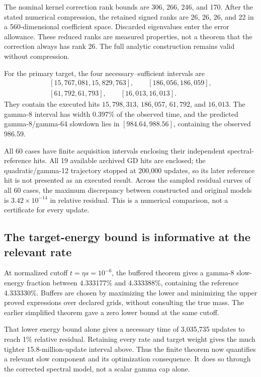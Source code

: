 \documentclass[11pt]{article}
\theoremstyle{definition}
\begin{document}
The nominal kernel correction rank bounds are 306, 266, 246, and 170.
After the stated numerical compression, the retained signed ranks are
26, 26, 26, and 22 in a 560-dimensional coefficient space. Discarded
eigenvalues enter the error allowance. These reduced ranks are measured
properties, not a theorem that the correction always has rank 26. The
full analytic construction remains valid without compression.

For the primary target, the four necessary--sufficient intervals are
\[
\begin{gathered}
\left[15{,}767{,}081,15{,}829{,}763\right],\qquad
\left[186{,}056,186{,}059\right],\\
\left[61{,}792,61{,}793\right],\qquad
\left[16{,}013,16{,}013\right].
\end{gathered}
\]
They contain the executed hits $15{,}798{,}313$, $186{,}057$, $61{,}792$,
and $16{,}013$. The gamma-8 interval has width 0.397\% of the observed
time, and the predicted gamma-8/gamma-64 slowdown lies in $[984.64,988.56]$,
containing the observed 986.59.

All 60 cases have finite acquisition intervals enclosing their independent
spectral-reference hits. All 19 available archived GD hits are enclosed;
the quadratic/gamma-12 trajectory stopped at 200,000 updates, so its later
reference hit is not presented as an executed result. Across the sampled
residual curves of all 60 cases, the maximum discrepancy between constructed
and original models is $3.42\times10^{-14}$ in relative residual. This is
a numerical comparison, not a certificate for every update.

\subsection*{The target-energy bound is informative at the relevant rate}
At normalized cutoff $t=\eta s=10^{-6}$, the buffered theorem gives a
gamma-8 slow-energy fraction between 4.333177\% and 4.333388\%, containing
the reference 4.333330\%. Buffers are chosen by maximizing the lower and
minimizing the upper proved expressions over declared grids, without
consulting the true mass. The earlier simplified theorem gave a zero
lower bound at the same cutoff.

That lower energy bound alone gives a necessary time of 3,035,735 updates
to reach 1\% relative residual. Retaining every rate and target weight
gives the much tighter 15.8-million-update interval above. Thus the finite
theorem now quantifies a relevant slow component and its optimization
consequence. It does so through the corrected spectral model, not a
scalar gamma cap alone.
\end{document}
